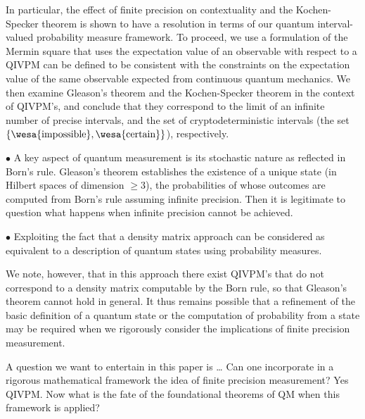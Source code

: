 \documentclass[english,reprint, aps, prl,superscriptaddress, showpacs,
showkeys, longbibliography, amsmath, amssymb]{revtex4-1}
\theoremstyle{plain}
\theoremstyle{definition}
\newcommand{\imposs}{{\text{\wesa{impossible}}}}
\newcommand{\necess}{{\text{\wesa{certain}}}}
\newcommand{\nb}{\nolinebreak[1] }
\begin{document}
In particular, the effect of finite precision on contextuality and the
Kochen-Specker theorem is shown to have a resolution in terms of our quantum interval-valued probability measure framework.  To proceed, we use a formulation of the Mermin square that uses the
expectation value of an observable with respect
to a QIVPM can be defined to be consistent with the constraints on the
expectation value of the same observable expected from continuous
quantum mechanics.  We then examine Gleason's
theorem\nb\cite{gleason1957,Redhead1987-REDINA,peres1995quantum} and the
Kochen-Specker theorem in the context of QIVPM's, and conclude that
they correspond to the limit of an infinite number of precise
intervals, and the set of cryptodeterministic intervals (the set\nb$\{\imposs,\necess\}$),
respectively.





${\bullet}$ A key aspect of quantum measurement is its stochastic nature as reflected in Born's rule.  Gleason's theorem establishes the existence of a unique state (in Hilbert spaces of dimension $\ge 3$), the probabilities of whose outcomes are computed from Born's rule assuming infinite precision.  Then it is legitimate to question what happens when infinite precision cannot be achieved.



${\bullet}$ Exploiting the fact that a density matrix approach can be
considered as equivalent to a description of quantum states using
probability measures\nb\cite{10.2307/2308516,Varadarajan2008}. %


We note, however, that in this approach there exist QIVPM's that do
not correspond to a density matrix computable by the Born rule, so
that Gleason's theorem cannot hold in general.  It thus remains
possible that a refinement of the basic definition of a quantum state
or the computation of probability from a state may be required when we
rigorously consider the implications of finite precision measurement.

A question we want to entertain in this paper is \ldots
Can one incorporate in a rigorous mathematical framework the idea of
finite precision measurement? Yes QIVPM. Now what is the fate of the 
foundational theorems of QM when this framework is applied?
\end{document}
